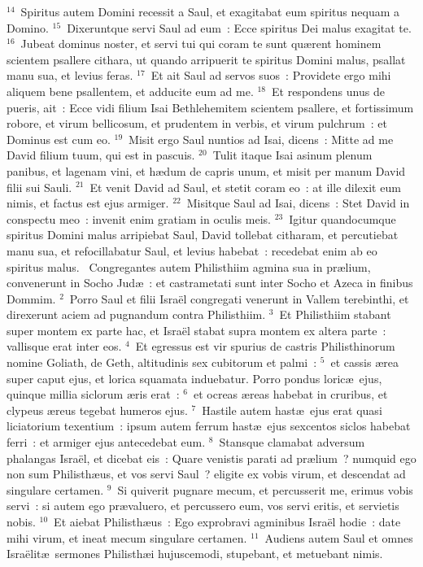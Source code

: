 ${}^{14}$~Spiritus autem Domini recessit a Saul, et exagitabat eum spiritus nequam a Domino.
${}^{15}$~Dixeruntque servi Saul ad eum~: Ecce spiritus Dei malus exagitat te.
${}^{16}$~Jubeat dominus noster, et servi tui qui coram te sunt qu\ae rent hominem scientem psallere cithara, ut quando arripuerit te spiritus Domini malus, psallat manu sua, et levius feras.
${}^{17}$~Et ait Saul ad servos suos~: Providete ergo mihi aliquem bene psallentem, et adducite eum ad me.
${}^{18}$~Et respondens unus de pueris, ait~: Ecce vidi filium Isai Bethlehemitem scientem psallere, et fortissimum robore, et virum bellicosum, et prudentem in verbis, et virum pulchrum~: et Dominus est cum eo.
${}^{19}$~Misit ergo Saul nuntios ad Isai, dicens~: Mitte ad me David filium tuum, qui est in pascuis.
${}^{20}$~Tulit itaque Isai asinum plenum panibus, et lagenam vini, et h\ae dum de capris unum, et misit per manum David filii sui Sauli.
${}^{21}$~Et venit David ad Saul, et stetit coram eo~: at ille dilexit eum nimis, et factus est ejus armiger.
${}^{22}$~Misitque Saul ad Isai, dicens~: Stet David in conspectu meo~: invenit enim gratiam in oculis meis.
${}^{23}$~Igitur quandocumque spiritus Domini malus arripiebat Saul, David tollebat citharam, et percutiebat manu sua, et refocillabatur Saul, et levius habebat~: recedebat enim ab eo spiritus malus.
~\lettrine[lines=10,image=true,loversize=0.05,lraise=-0.03]{C}{}ongregantes autem Philisthiim agmina sua in pr\ae lium, convenerunt in Socho Jud\ae~: et castrametati sunt inter Socho et Azeca in finibus Dommim.
${}^{2}$~Porro Saul et filii Isra\"el congregati venerunt in Vallem terebinthi, et direxerunt aciem ad pugnandum contra Philisthiim.
${}^{3}$~Et Philisthiim stabant super montem ex parte hac, et Isra\"el stabat supra montem ex altera parte~: vallisque erat inter eos.
${}^{4}$~Et egressus est vir spurius de castris Philisthinorum nomine Goliath, de Geth, altitudinis sex cubitorum et palmi~:
${}^{5}$~et cassis \ae rea super caput ejus, et lorica squamata induebatur. Porro pondus loric\ae\ ejus, quinque millia siclorum \ae ris erat~:
${}^{6}$~et ocreas \ae reas habebat in cruribus, et clypeus \ae reus tegebat humeros ejus.
${}^{7}$~Hastile autem hast\ae\ ejus erat quasi liciatorium texentium~: ipsum autem ferrum hast\ae\ ejus sexcentos siclos habebat ferri~: et armiger ejus antecedebat eum.
${}^{8}$~Stansque clamabat adversum phalangas Isra\"el, et dicebat eis~: Quare venistis parati ad pr\ae lium~? numquid ego non sum Philisth\ae us, et vos servi Saul~? eligite ex vobis virum, et descendat ad singulare certamen.
${}^{9}$~Si quiverit pugnare mecum, et percusserit me, erimus vobis servi~: si autem ego pr\ae valuero, et percussero eum, vos servi eritis, et servietis nobis.
${}^{10}$~Et aiebat Philisth\ae us~: Ego exprobravi agminibus Isra\"el hodie~: date mihi virum, et ineat mecum singulare certamen.
${}^{11}$~Audiens autem Saul et omnes Isra\"elit\ae\ sermones Philisth\ae i hujuscemodi, stupebant, et metuebant nimis.



